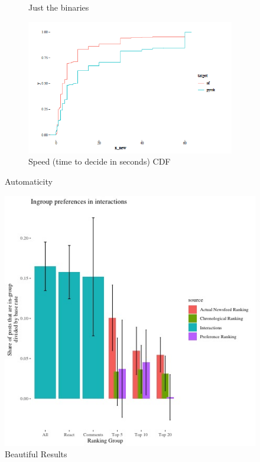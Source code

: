 \documentclass[12pt,letterpaper]{article}
\begin{document}
\begin{figure}
\begin{subfigure}{.5\textwidth}
        \caption{Just the binaries}
        \label{fig:sub-first}
    \end{subfigure}
    \begin{subfigure}{1\textwidth}
        \centering
        \includegraphics[width=.5\linewidth]{Output/Graphs/Experiments/Automaticity/speed cdf.png}  
        \caption{Speed (time to decide in seconds) CDF}
        \label{fig:sub-second}
    \end{subfigure}
\caption{Automaticity}
\end{figure}

\begin{figure}[!h]
    \centering
    \includegraphics[width=1\linewidth]{Output/Graphs/Audit/Interactions/US preferences reactions and actual rankings above base rate.jpg}
    \caption{Beautiful Results}
    \label{fig:behavior}
\end{figure}
\end{document}

